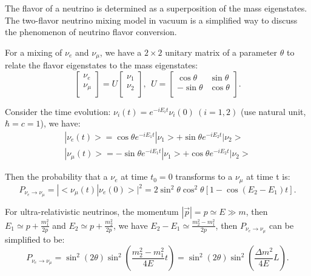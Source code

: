 \documentclass[preprint,12pt]{elsarticle}
\numberwithin{equation}{section}
\begin{document}
The flavor of a neutrino is determined as a superposition of the mass eigenstates. The two-flavor neutrino mixing model in vacuum is a simplified way to discuss the phenomenon of neutrino flavor conversion.

For a mixing of $\nu_e$ and $\nu_\mu$, we have a $2\times2$ unitary matrix of a parameter $\theta$ to relate the flavor eigenstates to the mass eigenstates\cite{cahn}:
\begin{equation}\label{eq:2flavormatrix}
\begin{bmatrix}
\nu_e\\
\nu_\mu\\
\end{bmatrix}
= U\begin{bmatrix}
\nu_1\\
\nu_2\\
\end{bmatrix}, ~~U=\begin{bmatrix}
\cos\theta &\sin\theta\\
-\sin\theta &\cos\theta\\
\end{bmatrix}.
\end{equation}

Consider the time evolution: $\nu_i(t) = e^{-iE_it}\nu_i(0)~(i = 1,2)$ (use natural unit, $\hbar=c=1$), we have:
\begin{equation}
\begin{aligned}
|\nu_e(t)> = \cos\theta e^{-iE_1t}|\nu_1>+\sin\theta e^{-iE_2t}|\nu_2>
\\
|\nu_\mu(t)> = -\sin\theta e^{-iE_1t}|\nu_1>+\cos\theta e^{-iE_2t}|\nu_2>
\end{aligned}
\end{equation}

Then the probability that a $\nu_e$ at time $t_0=0$ transforms to a $\nu_\mu$ at time t is:
\begin{equation}
P_{\nu_e\to\nu_\mu} = |<\nu_\mu(t)|\nu_e(0)>|^2= 2\sin^2\theta\cos^2\theta[1-\cos(E_2-E_1)t].
\end{equation}

For ultra-relativistic neutrinos, the momentum $|\vec{p}|=p\simeq E\gg m$, then $E_1\simeq p+\frac{m^2_1}{2p}$ and $E_2\simeq p+\frac{m^2_2}{2p}$, we have $E_2-E_1\simeq\frac{m_2^2-m_1^2}{2p}$,
then $P_{\nu_e\to\nu_\mu}$ can be simplified to be:
\begin{equation}\label{eq:oscillation}
P_{\nu_e\to\nu_\mu} = \sin^2( 2\theta)\sin^2(\frac{m_2^2-m_1^2}{4E}t)=\sin^2( 2\theta)\sin^2(\frac{\Delta m^2}{4E}L).
\end{equation}
\end{document}

